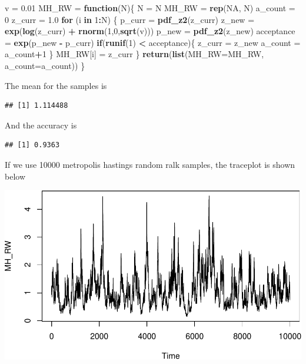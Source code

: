 \documentclass[]{article}
\newenvironment{Shaded}{\begin{snugshade}}{\end{snugshade}}
\newcommand{\KeywordTok}[1]{\textcolor[rgb]{0.13,0.29,0.53}{\textbf{#1}}}
\newcommand{\DataTypeTok}[1]{\textcolor[rgb]{0.13,0.29,0.53}{#1}}
\newcommand{\DecValTok}[1]{\textcolor[rgb]{0.00,0.00,0.81}{#1}}
\newcommand{\FloatTok}[1]{\textcolor[rgb]{0.00,0.00,0.81}{#1}}
\newcommand{\StringTok}[1]{\textcolor[rgb]{0.31,0.60,0.02}{#1}}
\newcommand{\OtherTok}[1]{\textcolor[rgb]{0.56,0.35,0.01}{#1}}
\newcommand{\ControlFlowTok}[1]{\textcolor[rgb]{0.13,0.29,0.53}{\textbf{#1}}}
\newcommand{\OperatorTok}[1]{\textcolor[rgb]{0.81,0.36,0.00}{\textbf{#1}}}
\newcommand{\NormalTok}[1]{#1}
\begin{document}
\begin{Shaded}
\begin{Highlighting}[]
\NormalTok{v =}\StringTok{ }\FloatTok{0.01}
\NormalTok{MH_RW =}\StringTok{ }\ControlFlowTok{function}\NormalTok{(N)\{}
\NormalTok{  N =}\StringTok{ }\NormalTok{N}
\NormalTok{  MH_RW =}\StringTok{ }\KeywordTok{rep}\NormalTok{(}\OtherTok{NA}\NormalTok{, N)}
\NormalTok{  a_count =}\StringTok{ }\DecValTok{0}
\NormalTok{  z_curr =}\StringTok{ }\FloatTok{1.0}
  \ControlFlowTok{for}\NormalTok{ (i }\ControlFlowTok{in} \DecValTok{1}\OperatorTok{:}\NormalTok{N) \{}
\NormalTok{    p_curr =}\StringTok{ }\KeywordTok{pdf_z2}\NormalTok{(z_curr)}
\NormalTok{    z_new =}\StringTok{ }\KeywordTok{exp}\NormalTok{(}\KeywordTok{log}\NormalTok{(z_curr) }\OperatorTok{+}\StringTok{ }\KeywordTok{rnorm}\NormalTok{(}\DecValTok{1}\NormalTok{,}\DecValTok{0}\NormalTok{,}\KeywordTok{sqrt}\NormalTok{(v)))}
\NormalTok{    p_new =}\StringTok{ }\KeywordTok{pdf_z2}\NormalTok{(z_new)}
\NormalTok{    acceptance =}\StringTok{ }\KeywordTok{exp}\NormalTok{(p_new }\OperatorTok{-}\StringTok{ }\NormalTok{p_curr)}
    \ControlFlowTok{if}\NormalTok{(}\KeywordTok{runif}\NormalTok{(}\DecValTok{1}\NormalTok{) }\OperatorTok{<}\StringTok{ }\NormalTok{acceptance)\{}
\NormalTok{      z_curr =}\StringTok{ }\NormalTok{z_new}
\NormalTok{      a_count =}\StringTok{ }\NormalTok{a_count}\OperatorTok{+}\DecValTok{1}
\NormalTok{    \}}
\NormalTok{    MH_RW[i] =}\StringTok{ }\NormalTok{z_curr}
\NormalTok{  \}}
  \KeywordTok{return}\NormalTok{(}\KeywordTok{list}\NormalTok{(}\DataTypeTok{MH_RW=}\NormalTok{MH_RW, }\DataTypeTok{a_count=}\NormalTok{a_count))}
\NormalTok{\}}
\end{Highlighting}
\end{Shaded}

The mean for the samples is

\begin{verbatim}
## [1] 1.114488
\end{verbatim}

And the accuracy is

\begin{verbatim}
## [1] 0.9363
\end{verbatim}

If we use 10000 metropolis hastings random ralk samples, the traceplot
is shown below

\includegraphics{AMS206b_H4_files/figure-latex/unnamed-chunk-11-1.pdf}
\end{document}
